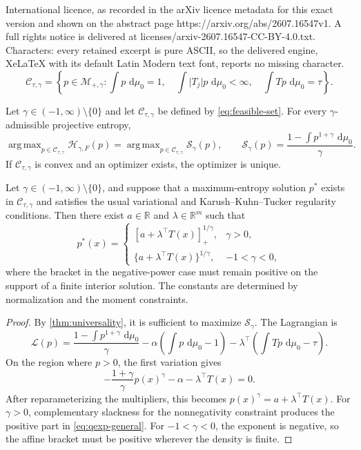 \documentclass[10pt,a4paper]{amsart}
\DeclareMathOperator*{\argmax}{arg\,max}
\newcommand{\R}{\mathbb{R}}
\newcommand{\calC}{\mathcal{C}}
\newcommand{\calH}{\mathcal{H}}
\newcommand{\calM}{\mathcal{M}}
\newcommand{\calS}{\mathcal{S}}
\newcommand{\dd}{\,\mathrm{d}}
\newcommand{\pos}[1]{\left[#1\right]_+}
\begin{document}
International licence, as recorded in the arXiv licence metadata for this exact version and shown on the abstract page https://arxiv.org/abs/2607.16547v1. A full rights notice is delivered at licenses/arxiv-2607.16547-CC-BY-4.0.txt. Characters: every retained excerpt is pure ASCII, so the delivered engine, XeLaTeX with its default Latin Modern text font, reports no missing character.
\begin{equation}
\calC_{\tau,\gamma}
=
\left\{
 p\in\calM_{+,\gamma}:
 \int p\,\dd\mu_0=1,
 \quad
 \int \lvert T_j\rvert p\,\dd\mu_0<\infty,
 \quad
 \int Tp\,\dd\mu_0=\tau
\right\}.
\label{eq:feasible-set}
\end{equation}

\begin{theorem}\label{thm:universality}
Let $\gamma\in(-1,\infty)\setminus\{0\}$ and let $\calC_{\tau,\gamma}$ be defined by \cref{eq:feasible-set}. For every $\gamma$-admissible projective entropy,
\begin{equation}
 \argmax_{p\in\calC_{\tau,\gamma}}
 \calH_{\gamma,F}(p)
 =
 \argmax_{p\in\calC_{\tau,\gamma}}
 \calS_\gamma(p),
 \qquad
 \calS_\gamma(p)=\frac{1-\int p^{1+\gamma}\,\dd\mu_0}{\gamma}.
\label{eq:universality-argmax}
\end{equation}
If $\calC_{\tau,\gamma}$ is convex and an optimizer exists, the optimizer is unique.
\end{theorem}

\begin{theorem}\label{thm:qexp}
Let $\gamma\in(-1,\infty)\setminus\{0\}$, and suppose that a maximum-entropy solution $p^*$ exists in $\calC_{\tau,\gamma}$ and satisfies the usual variational and Karush--Kuhn--Tucker regularity conditions. Then there exist $a\in\R$ and $\lambda\in\R^m$ such that
\begin{equation}
 p^*(x)=
 \begin{cases}
 \pos{a+\lambda^\top T(x)}^{1/\gamma},&\gamma>0,\\[1mm]
 \{a+\lambda^\top T(x)\}^{1/\gamma},&-1<\gamma<0,
 \end{cases}
\label{eq:qexp-general}
\end{equation}
where the bracket in the negative-power case must remain positive on the support of a finite interior solution. The constants are determined by normalization and the moment constraints.
\end{theorem}

\begin{proof}
By \cref{thm:universality}, it is sufficient to maximize $\calS_\gamma$. The Lagrangian is
\[
 \mathcal L(p)
 =
 \frac{1-\int p^{1+\gamma}\,\dd\mu_0}{\gamma}
 -\alpha\left(\int p\,\dd\mu_0-1\right)
 -\lambda^\top\left(\int Tp\,\dd\mu_0-\tau\right).
\]
On the region where $p>0$, the first variation gives
\[
 -\frac{1+\gamma}{\gamma}p(x)^\gamma
 -\alpha-\lambda^\top T(x)=0.
\]
After reparameterizing the multipliers, this becomes $p(x)^\gamma=a+\lambda^\top T(x)$. For $\gamma>0$, complementary slackness for the nonnegativity constraint produces the positive part in \cref{eq:qexp-general}. For $-1<\gamma<0$, the exponent is negative, so the affine bracket must be positive wherever the density is finite.
\end{proof}
\end{document}
